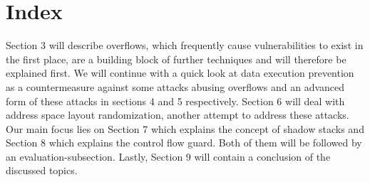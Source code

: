\documentclass[10pt,twocolumn,a4paper]{article}
\begin{document}
\section{Index}
Section 3 will describe overflows, which frequently cause vulnerabilities to exist in the first place, are a building block of further techniques and will therefore be explained first.
We will continue with a quick look at data execution prevention as a countermeasure against some attacks abusing overflows and an advanced form of these attacks in sections 4 and 5 respectively.
Section 6 will deal with address space layout randomization, another attempt to address these attacks.
Our main focus lies on Section 7 which explains the concept of shadow stacks and Section 8 which explains the control flow guard. Both of them will be followed by an evaluation-subsection.
Lastly, Section 9 will contain a conclusion of the discussed topics.
\end{document}
